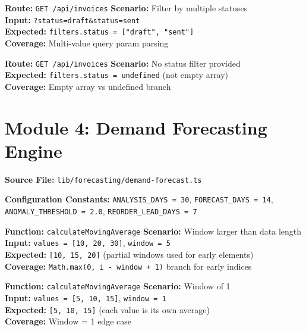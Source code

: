 \documentclass[12pt,a4paper]{report}
\newcommand{\pthree}{\textbf{\color{p3blue}P3}}
\begin{document}
\begin{tcolorbox}[testbox,title={INV-014 \hfill \pthree}]
\textbf{Route:} \texttt{GET /api/invoices} \quad \textbf{Scenario:} Filter by multiple statuses \\
\textbf{Input:} \texttt{?status=draft\&status=sent} \\
\textbf{Expected:} \texttt{filters.status = ["draft", "sent"]} \\
\textbf{Coverage:} Multi-value query param parsing
\end{tcolorbox}

\begin{tcolorbox}[testbox,title={INV-015 \hfill \pthree}]
\textbf{Route:} \texttt{GET /api/invoices} \quad \textbf{Scenario:} No status filter provided \\
\textbf{Expected:} \texttt{filters.status = undefined} (not empty array) \\
\textbf{Coverage:} Empty array vs undefined branch
\end{tcolorbox}

\section{Module 4: Demand Forecasting Engine}

\textbf{Source File:} \texttt{lib/forecasting/demand-forecast.ts}

\textbf{Configuration Constants:} \texttt{ANALYSIS\_DAYS = 30}, \texttt{FORECAST\_DAYS = 14}, \texttt{ANOMALY\_THRESHOLD = 2.0}, \texttt{REORDER\_LEAD\_DAYS = 7}

\begin{tcolorbox}[testbox,title={FORE-001 \hfill \pthree}]
\textbf{Function:} \texttt{calculateMovingAverage} \quad \textbf{Scenario:} Window larger than data length \\
\textbf{Input:} \texttt{values = [10, 20, 30]}, \texttt{window = 5} \\
\textbf{Expected:} \texttt{[10, 15, 20]} (partial windows used for early elements) \\
\textbf{Coverage:} \texttt{Math.max(0, i - window + 1)} branch for early indices
\end{tcolorbox}

\begin{tcolorbox}[testbox,title={FORE-002 \hfill \pthree}]
\textbf{Function:} \texttt{calculateMovingAverage} \quad \textbf{Scenario:} Window of 1 \\
\textbf{Input:} \texttt{values = [5, 10, 15]}, \texttt{window = 1} \\
\textbf{Expected:} \texttt{[5, 10, 15]} (each value is its own average) \\
\textbf{Coverage:} Window = 1 edge case
\end{tcolorbox}
\end{document}
